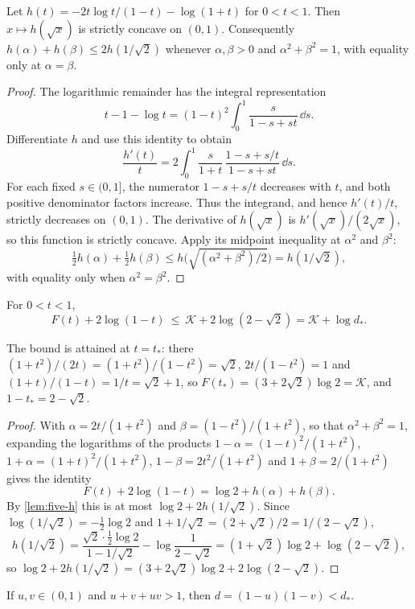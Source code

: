 \begin{lemma}\label{lem:five-h}
Let $h(t)=-2t\log t/(1-t)-\log(1+t)$ for $0<t<1$. Then $x\mapsto h(\sqrt x)$ is strictly concave on
$(0,1)$. Consequently $h(\alpha)+h(\beta)\le2h(1/\sqrt2)$ whenever $\alpha,\beta>0$ and
$\alpha^2+\beta^2=1$, with equality only at $\alpha=\beta$.
\end{lemma}

\begin{proof}
The logarithmic remainder has the integral representation
\[
 t-1-\log t=(1-t)^2\int_0^1\frac{s}{1-s+st}\,\dd s.
\]
Differentiate $h$ and use this identity to obtain
\[
 \frac{h'(t)}{t}
 =2\int_0^1\frac{s}{1+t}\,\frac{1-s+s/t}{1-s+st}\,\dd s.
\]
For each fixed $s\in(0,1]$, the numerator $1-s+s/t$ decreases with $t$, and both positive
denominator factors increase. Thus the integrand, and hence $h'(t)/t$, strictly decreases on
$(0,1)$. The derivative of $h(\sqrt x)$ is $h'(\sqrt x)/(2\sqrt x)$, so this function is strictly
concave. Apply its midpoint inequality at $\alpha^2$ and $\beta^2$:
\[
 \tfrac12h(\alpha)+\tfrac12h(\beta)
 \le h\bigl(\sqrt{(\alpha^2+\beta^2)/2}\bigr)=h(1/\sqrt2),
\]
with equality only when $\alpha^2=\beta^2$.
\end{proof}

\begin{lemma}\label{lem:five-envelope}
For $0<t<1$,
\[
 F(t)+2\log(1-t)\ \le\ \mathcal K+2\log(2-\sqrt2)=\mathcal K+\log d_*.
\]
\end{lemma}

The bound is attained at $t=t_*$: there $(1+t^2)/(2t)=(1+t^2)/(1-t^2)=\sqrt2$,
$2t/(1-t^2)=1$ and $(1+t)/(1-t)=1/t=\sqrt2+1$, so $F(t_*)=(3+2\sqrt2)\log2=\mathcal K$, and
$1-t_*=2-\sqrt2$.

\begin{proof}
With $\alpha=2t/(1+t^2)$ and $\beta=(1-t^2)/(1+t^2)$, so that $\alpha^2+\beta^2=1$, expanding
the logarithms of the products $1-\alpha=(1-t)^2/(1+t^2)$, $1+\alpha=(1+t)^2/(1+t^2)$,
$1-\beta=2t^2/(1+t^2)$ and $1+\beta=2/(1+t^2)$ gives the identity
\[
 F(t)+2\log(1-t)=\log2+h(\alpha)+h(\beta).
\]
By \cref{lem:five-h} this is at most $\log2+2h(1/\sqrt2)$. Since $\log(1/\sqrt2)=-\tfrac12\log2$
and $1+1/\sqrt2=(2+\sqrt2)/2=1/(2-\sqrt2)$,
\[
 h(1/\sqrt2)=\frac{\sqrt2\cdot\tfrac12\log2}{1-1/\sqrt2}-\log\frac{1}{2-\sqrt2}
 =(1+\sqrt2)\log2+\log(2-\sqrt2),
\]
so $\log2+2h(1/\sqrt2)=(3+2\sqrt2)\log2+2\log(2-\sqrt2)$.
\end{proof}

\begin{lemma}\label{lem:five-d}
If $u,v\in(0,1)$ and $u+v+uv>1$, then $d=(1-u)(1-v)<d_*$.
\end{lemma}

